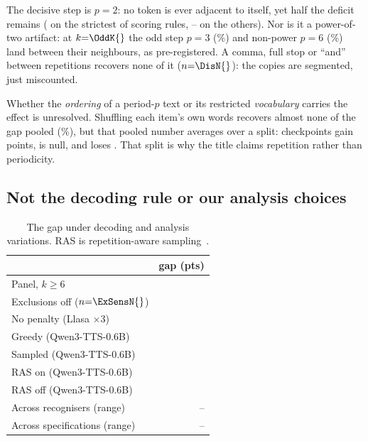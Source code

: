 \documentclass{article}
\newcommand{\tabsize}{\small}
\begin{document}
The decisive step is $p{=}2$: no token is ever adjacent to itself, yet
half the deficit remains (\PerRatioScan{} on the strictest of
\PerNRules{} scoring rules, \PerRatioRecLo{}--\PerRatioRecHi{} on the
others). Nor is it a
power-of-two artifact: at $k{=}\OddK{}$ the odd step $p{=}3$
(\OddPThree{}\%) and non-power $p{=}6$ (\OddPSix{}\%) land between
their neighbours, as pre-registered. A comma,
full stop or ``and'' between repetitions recovers none of it
($n{=}\DisN{}$): the copies are segmented, just miscounted.

Whether the \emph{ordering} of a period-$p$ text or its restricted
\emph{vocabulary} carries the effect is unresolved. Shuffling each item's own words recovers almost none of the gap pooled
(\ShufRPct{}\%), but that pooled number averages over a split:
\ShufNUp{} checkpoints gain \ShufUpGain{} points, \ShufNNull{} is null,
and \ShufDownCk{} loses \ShufDownLoss{}. That split is why the title claims
repetition rather than periodicity.

\subsection{Not the decoding rule or our analysis choices}

\begin{table}[t]
\centering
\caption{The gap under decoding and analysis variations. RAS is
repetition-aware sampling~\cite{chen2024valle2}.}
\label{tab:vary}
{\tabsize\setlength{\tabcolsep}{3pt}
\begin{tabular}{lr}
\toprule
 & gap (pts) \\
\midrule
Panel, $k\ge6$                    & \ARPoolGap{} \\
Exclusions off ($n{=}\ExSensN{}$) & \ExSensAll{} \\
No penalty (Llasa $\times$3)      & \PenNoneGap{} \\
Greedy (Qwen3-TTS-0.6B)                   & \GreedyGap{} \\
Sampled (Qwen3-TTS-0.6B)                  & \GreedySampGap{} \\
RAS on (Qwen3-TTS-0.6B)                   & \RasOnGap{} \\
RAS off (Qwen3-TTS-0.6B)                  & \RasOffGap{} \\
Across \IndNJudges{} recognisers (range) & \IndGapLo{}--\IndGapHi{} \\
Across \SpecN{} specifications (range)  & \SpecLo{}--\SpecHi{} \\
\bottomrule
\end{tabular}}
\end{table}
\end{document}
